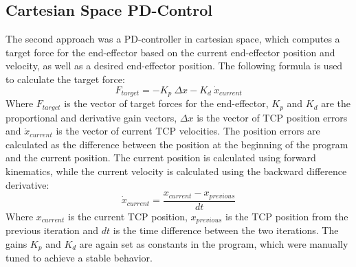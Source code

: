 \subsection{Cartesian Space PD-Control}
The second approach was a PD-controller in cartesian space, which computes a target force for the end-effector based on the current end-effector position and velocity,
as well as a desired end-effector position. The following formula is used to calculate the target force\parencite{murrayMathematicalIntroductionRobotic2017}:
\begin{equation}
    F_{target} = - K_p \ \Delta x - K_d \ \dot{x}_{current}
\end{equation}
Where $F_{target}$ is the vector of target forces for the end-effector, $K_p$ and $K_d$ are the proportional and derivative gain vectors, $\Delta x$ is the vector of TCP
position errors and $\dot{x}_{current}$ is the vector of current TCP velocities.
The position errors are calculated as the difference between the position at the beginning of the program and the current position.
The current position is calculated using forward kinematics\parencite{zeitlerDualArmAerialManipulation}, while the current velocity is calculated using the backward difference
derivative\parencite{lohmannSkriptPraktikumReglerimplementierung2023}:
\begin{equation}
    \dot{x}_{current} = \frac{x_{current} - x_{previous}}{dt}
\end{equation}
Where $x_{current}$ is the current TCP position, $x_{previous}$ is the TCP position from the previous iteration and $dt$ is the time difference between the two
iterations.
The gains $K_p$ and $K_d$ are again set as constants in the program, which were manually tuned to achieve a stable behavior.

